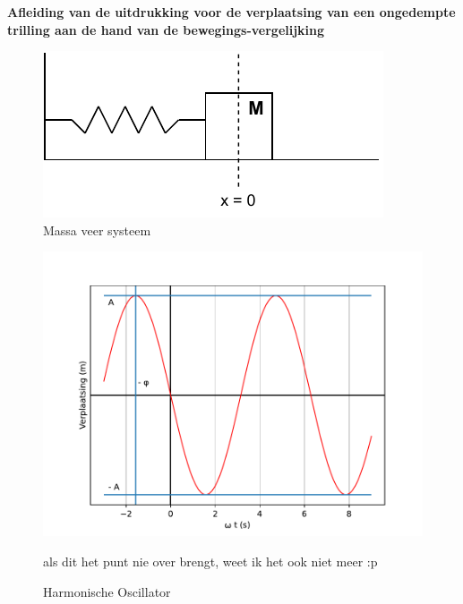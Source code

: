 \documentclass[a4paper,kul]{kulakarticle} %
\begin{document}
\textbf{Afleiding van de uitdrukking voor de verplaatsing van een ongedempte trilling aan de hand van de bewegings-vergelijking}\\
\begin{figure}[htbp]
	\centering
	\includegraphics[width=0.4\linewidth]{MassaVeer}
	\caption[Massa veer systeem]{Massa veer systeem}
	\label{fig:massaveer}
\end{figure}
\begin{figure}[htbp]
	\centering
	\includegraphics[width=0.7\linewidth]{Harmonische_Oscillator}
	\caption[Harmonische Oscillator]{Harmonische Oscillator}
	\label{fig:harmonischeoscilator}als dit het punt nie over brengt, weet ik het ook niet meer :p
\end{figure}
\end{document}
